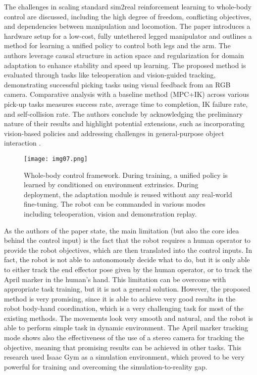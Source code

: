 The challenges in scaling standard sim2real reinforcement learning to whole-body control
are discussed, including the high degree of freedom, conflicting objectives, and dependencies
between manipulation and locomotion. The paper introduces a hardware setup for a low-cost, fully
untethered legged manipulator and outlines a method for learning a unified policy to control
both legs and the arm. The authors leverage causal structure in action space and regularization
for domain adaptation to enhance stability and speed up learning.
The proposed method is evaluated through tasks like teleoperation and vision-guided tracking,
demonstrating successful picking tasks using visual feedback from an RGB camera.
Comparative analysis with a baseline method (MPC+IK) across various pick-up tasks measures success rate,
average time to completion, IK failure rate, and self-collision rate.
The authors conclude by acknowledging the preliminary nature of their results and highlight
potential extensions, such as incorporating vision-based policies and addressing challenges
in general-purpose object interaction \cite{fu2022deeplegged}.

\begin{figure}[H]
	\centering
	\texttt{[image: img07.png]}
	\captionsetup{width=1\linewidth}
	\caption{Whole-body control framework. During training, a unified policy is learned by conditioned on
		environment extrinsics. During deployment, the adaptation module is reused without
		any real-world fine-tuning.
		The robot can be commanded in various modes including teleoperation, vision and demonstration replay.
		\cite{fu2022deeplegged}}
	\label{fig:img07}
\end{figure}

As the authors of the paper \cite{fu2022deeplegged} state, the main limitation (but also the core
idea behind the control input) is the fact that the robot requires a human operator to
provide the robot objectives, which are then translated into the control inputs. In fact,
the robot is not able to autonomously decide what to do, but it is only able to either track the
end effector pose given by the human operator, or to track the April marker in the human's hand.
This limitation can be overcome with appropriate task training, but it is not a general solution.
However, the proposed method is very promising, since it is able to achieve very good results
in the robot body-hand coordination, which is a very challenging task for most of the existing
methods. The movements look very smooth and natural, and the robot is able to perform
simple task in dynamic environment. The April marker tracking mode shows also the effectiveness of
the use of a stereo camera for tracking the objective, meaning that promising results can be
achieved in other tasks. This research used Isaac Gym as a simulation environment, which
proved to be very powerful for training and overcoming the simulation-to-reality gap.

